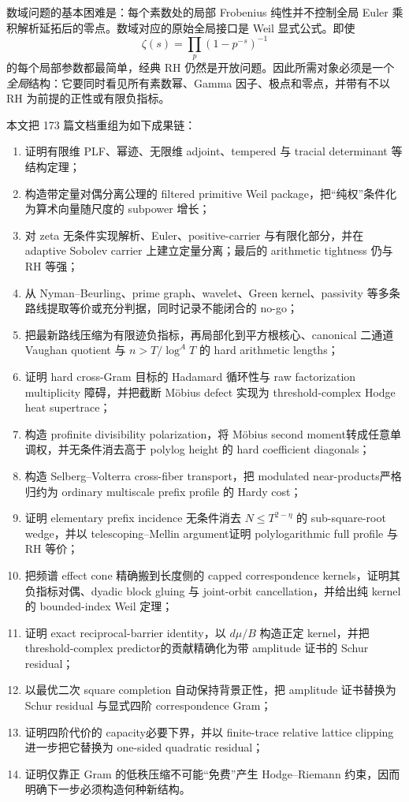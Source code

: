 \documentclass[UTF8,11pt,a4paper]{ctexart}
\theoremstyle{definition}
\theoremstyle{remark}
\newcommand{\1}{\mathbf 1}
\begin{document}
数域问题的基本困难是：每个素数处的局部 Frobenius 纯性并不控制全局 Euler 乘积解析延拓后的零点。数域对应的原始全局接口是 Weil 显式公式\cite{WeilExplicit}。即使
\[
  \zeta(s)=\prod_p(1-p^{-s})^{-1}
\]
的每个局部参数都最简单，经典 RH 仍然是开放问题。因此所需对象必须是一个\emph{全局}结构：它要同时看见所有素数幂、Gamma 因子、极点和零点，并带有不以 RH 为前提的正性或有限负指标。

本文把 173 篇文档重组为如下成果链：
\begin{enumerate}
  \item 证明有限维 PLF、幂迹、无限维 adjoint、tempered 与 tracial determinant 等结构定理；
  \item 构造带定量对偶分离公理的 filtered primitive Weil package，把“纯权”条件化为算术向量随尺度的 subpower 增长；
  \item 对 zeta 无条件实现解析、Euler、positive-carrier 与有限化部分，并在 adaptive Sobolev carrier 上建立定量分离；最后的 arithmetic tightness 仍与 RH 等强；
  \item 从 Nyman--Beurling、prime graph、wavelet、Green kernel、passivity 等多条路线提取等价或充分判据，同时记录不能闭合的 no-go；
  \item 把最新路线压缩为有限迹负指标，再局部化到平方根核心、canonical 二通道 Vaughan quotient 与 $n>T/\log^A T$ 的 hard arithmetic lengths；
  \item 证明 hard cross-Gram 目标的 Hadamard 循环性与 raw factorization multiplicity 障碍，并把截断 M\"obius defect 实现为 threshold-complex Hodge heat supertrace；
  \item 构造 profinite divisibility polarization，将 M\"obius second moment转成任意单调权，并无条件消去高于 polylog height 的 hard coefficient diagonals；
  \item 构造 Selberg--Volterra cross-fiber transport，把 modulated near-products严格归约为 ordinary multiscale prefix profile 的 Hardy cost；
  \item 证明 elementary prefix incidence 无条件消去 $N\leq T^{2-\eta}$ 的 sub-square-root wedge，并以 telescoping--Mellin argument证明 polylogarithmic full profile 与 RH 等价；
  \item 把频谱 effect cone 精确搬到长度侧的 capped correspondence kernels，证明其负指标对偶、dyadic block gluing 与 joint-orbit cancellation，并给出纯 kernel 的 bounded-index Weil 定理；
  \item 证明 exact reciprocal-barrier identity，以 $d\mu/B$ 构造正定 kernel，并把 threshold-complex predictor的贡献精确化为带 amplitude 证书的 Schur residual；
  \item 以最优二次 square completion 自动保持背景正性，把 amplitude 证书替换为 Schur residual 与显式四阶 correspondence Gram；
  \item 证明四阶代价的 capacity必要下界，并以 finite-trace relative lattice clipping进一步把它替换为 one-sided quadratic residual；
  \item 证明仅靠正 Gram 的低秩压缩不可能“免费”产生 Hodge--Riemann 约束，因而明确下一步必须构造何种新结构。
\end{enumerate}
\end{document}
